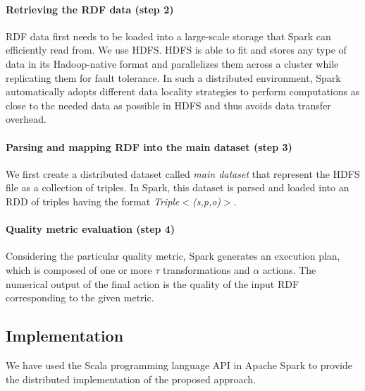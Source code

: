 \paragraph{Retrieving the RDF data (step 2)} RDF data first needs to be loaded into a large-scale storage that Spark can efficiently read from.
We use \gls{HDFS}.
HDFS is able to fit and stores any type of data in its Hadoop-native format and parallelizes them across a cluster while replicating them for fault tolerance.
In such a distributed environment, Spark automatically adopts different data locality strategies to perform computations as close to the needed data as possible in HDFS and thus avoids data transfer overhead.
 
\paragraph{Parsing and mapping RDF into the main dataset (step 3)} We first create a distributed dataset called \emph{main dataset} that represent the HDFS file as a collection of triples.
In Spark, this dataset is parsed and loaded into an RDD of triples having the format 
\emph{Triple$<$(s,p,o)$>$}.

\paragraph{Quality metric evaluation (step 4)} Considering the particular quality metric, Spark generates an execution plan, which is composed of one or more $\tau$ transformations and $\alpha$ actions. The numerical output of the final action is the quality of the input RDF corresponding to the given metric.


\subsection{Implementation}
\label{subsection:distqualityassessment-implementation}

We have used the Scala programming language API in Apache Spark to provide the distributed implementation of the proposed approach. 


